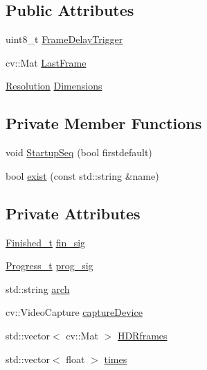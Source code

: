 \subsection*{Public Attributes}
\begin{DoxyCompactItemize}
\item 
uint8\+\_\+t \hyperlink{class_hardware_1_1_microscope_ac2da14781a22924a389fc287df3dbfda}{Frame\+Delay\+Trigger}
\item 
cv\+::\+Mat \hyperlink{class_hardware_1_1_microscope_afbbec8a14cd277cec7c3ee6ce0ba54a1}{Last\+Frame}
\item 
\hyperlink{struct_hardware_1_1_microscope_1_1_resolution}{Resolution} \hyperlink{class_hardware_1_1_microscope_ae89c25318a095e2efcdf48fb8f769038}{Dimensions}
\end{DoxyCompactItemize}
\subsection*{Private Member Functions}
\begin{DoxyCompactItemize}
\item 
void \hyperlink{class_hardware_1_1_microscope_ad045b565e258b1b3b68c2c55273b3058}{Startup\+Seq} (bool firstdefault)
\item 
bool \hyperlink{class_hardware_1_1_microscope_a44da9ff8054b51b4659238cc7eda2baf}{exist} (const std\+::string \&name)
\end{DoxyCompactItemize}
\subsection*{Private Attributes}
\begin{DoxyCompactItemize}
\item 
\hyperlink{class_hardware_1_1_microscope_a40676fa031cfc911b9b180f902f1e00d}{Finished\+\_\+t} \hyperlink{class_hardware_1_1_microscope_a8c23e6a55ef77443e861418a15c6e244}{fin\+\_\+sig}
\item 
\hyperlink{class_hardware_1_1_microscope_a2b031f9b1c8b0294da0c989dbf728d79}{Progress\+\_\+t} \hyperlink{class_hardware_1_1_microscope_a819e11c0bfdb12b4c42b7ee2d330cb4d}{prog\+\_\+sig}
\item 
std\+::string \hyperlink{class_hardware_1_1_microscope_a2e74ed11f3426a1a6adf05ec2d842066}{arch}
\item 
cv\+::\+Video\+Capture \hyperlink{class_hardware_1_1_microscope_a8fd921d7c937e808c5bc44c0294aa490}{capture\+Device}
\item 
std\+::vector$<$ cv\+::\+Mat $>$ \hyperlink{class_hardware_1_1_microscope_a2c73db8010320428db3fd41d840dd0eb}{H\+D\+Rframes}
\item 
std\+::vector$<$ float $>$ \hyperlink{class_hardware_1_1_microscope_a5aababdeaa4cc4da051c0e44cba20003}{times}
\end{DoxyCompactItemize}


